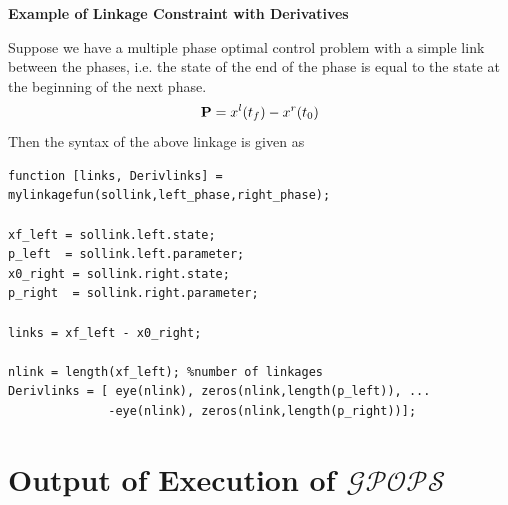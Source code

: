\documentclass[10pt,final]{report}
\newcommand{\gpops}{$\mathcal{GPOPS}$~}
\newenvironment{shadedframe}{%
  \def\FrameCommand{\fcolorbox{black}{shadecolor}}%
  \MakeFramed {\FrameRestore}}
{\endMakeFramed}
\begin{document}
\begin{shadedframe}
{\noindent}{\bf Example of Linkage Constraint with Derivatives}
\vspace{12pt}

{\noindent}Suppose we have a multiple phase optimal control problem with a simple link between the phases, i.e. the state of the end of the phase is equal to the state at the beginning of the next phase.  \begin{displaymath}
\mathbf{P} = x^l(t_f) - x^r(t_0)
\end{displaymath}
Then the syntax of the above linkage is given as
\begin{verbatim}
function [links, Derivlinks] = mylinkagefun(sollink,left_phase,right_phase);

xf_left = sollink.left.state;
p_left  = sollink.left.parameter;
x0_right = sollink.right.state;
p_right  = sollink.right.parameter;

links = xf_left - x0_right;

nlink = length(xf_left); %number of linkages
Derivlinks = [ eye(nlink), zeros(nlink,length(p_left)), ...
              -eye(nlink), zeros(nlink,length(p_right))];
\end{verbatim}
\end{shadedframe}


\section{Output of Execution of \gpops\label{sect: output}}
\end{document}
